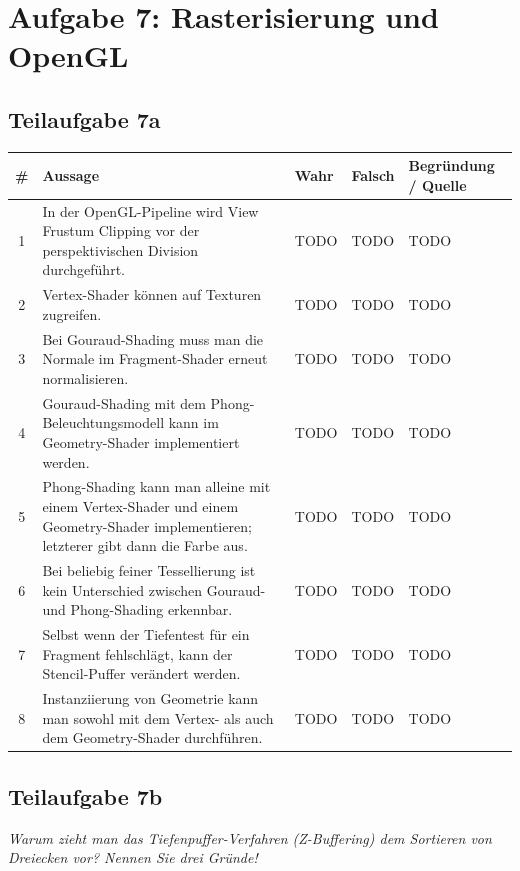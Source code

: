 \documentclass[a4paper]{scrartcl}
\begin{document}
\section*{Aufgabe 7: Rasterisierung und OpenGL}
\subsection*{Teilaufgabe 7a}
\begin{tabular}{cp{8cm}llp{4cm}}\toprule
\# & Aussage & Wahr & Falsch & Begründung / Quelle \\\midrule
 1 & In der OpenGL-Pipeline wird View Frustum Clipping vor der perspektivischen Division durchgeführt.                                    & TODO & TODO & TODO \\
 2 & Vertex-Shader können auf Texturen zugreifen.                                                                                         & TODO & TODO & TODO \\
 3 & Bei Gouraud-Shading muss man die Normale im Fragment-Shader erneut normalisieren.                                                    & TODO & TODO & TODO \\
 4 & Gouraud-Shading mit dem Phong-Beleuchtungsmodell kann im Geometry-Shader implementiert werden.                                       & TODO & TODO & TODO \\
 5 & Phong-Shading kann man alleine mit einem Vertex-Shader und einem Geometry-Shader implementieren; letzterer gibt dann die Farbe aus.  & TODO & TODO & TODO \\
 6 & Bei beliebig feiner Tessellierung ist kein Unterschied zwischen Gouraud- und Phong-Shading erkennbar.                                & TODO & TODO & TODO \\
 7 & Selbst wenn der Tiefentest für ein Fragment fehlschlägt, kann der Stencil-Puffer verändert werden.                                   & TODO & TODO & TODO \\
 8 & Instanziierung von Geometrie kann man sowohl mit dem Vertex- als auch dem Geometry-Shader durchführen.                               & TODO & TODO & TODO \\\bottomrule
\end{tabular}

\subsection*{Teilaufgabe 7b}
\textit{Warum zieht man das Tiefenpuffer-Verfahren (Z-Buffering) dem Sortieren von Dreiecken vor? Nennen Sie drei Gründe!}
\end{document}
